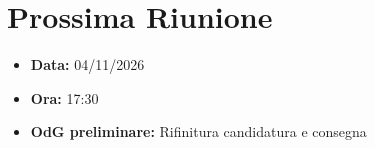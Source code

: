 \documentclass[a4paper, 11pt]{article}
\begin{document}
\vspace{0.5cm}
\section{Prossima Riunione}
\begin{itemize}
    \item \textbf{Data:} 04/11/2026
    \item \textbf{Ora:} 17:30
    \item \textbf{OdG preliminare:} Rifinitura candidatura e consegna
\end{itemize}
\end{document}
